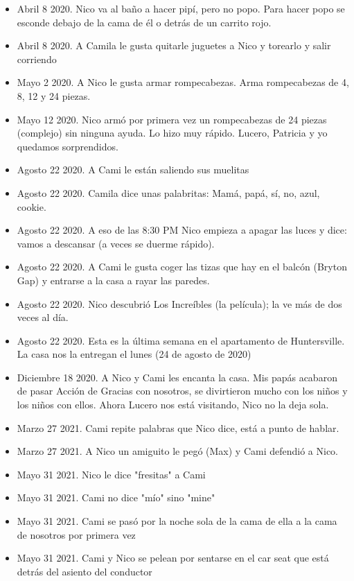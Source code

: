 \documentclass[12pt]{article}
\begin{document}
\begin{itemize}
  \item Abril 8 2020. Nico va al ba\~no a hacer pip\'i, pero no popo. Para hacer popo se esconde debajo de la cama de \'el o detr\'as de un carrito rojo.
  \item Abril 8 2020. A Camila le gusta quitarle juguetes a Nico y torearlo y salir corriendo
  \item Mayo 2 2020. A Nico le gusta armar rompecabezas. Arma rompecabezas de 4, 8, 12 y 24 piezas.
  \item Mayo 12 2020. Nico arm\'o por primera vez un rompecabezas de 24 piezas (complejo) sin ninguna ayuda. Lo hizo muy r\'apido. Lucero, Patricia y yo quedamos sorprendidos.
  \item Agosto 22 2020. A Cami le est\'an saliendo sus muelitas
  \item Agosto 22 2020. Camila dice unas palabritas: Mam\'a, pap\'a, s\'i, no, azul, cookie.
  \item Agosto 22 2020. A eso de las 8:30 PM Nico empieza a apagar las luces y dice: vamos a descansar (a veces se duerme r\'apido).
  \item Agosto 22 2020. A Cami le gusta coger las tizas que hay en el balc\'on (Bryton Gap) y entrarse a la casa a rayar las paredes.
  \item Agosto 22 2020. Nico descubri\'o Los Incre\'ibles (la pel\'icula); la ve m\'as de dos veces al d\'ia.
  \item Agosto 22 2020. Esta es la \'ultima semana en el apartamento de Huntersville. La casa nos la entregan el lunes (24 de agosto de 2020)
  \item Diciembre 18 2020. A Nico y Cami les encanta la casa. Mis pap\'as acabaron de pasar Acci\'on de Gracias con nosotros, se divirtieron mucho con los ni\~nos y los ni\~nos con ellos. Ahora Lucero nos est\'a visitando, Nico no la deja sola.
  \item Marzo 27 2021. Cami repite palabras que Nico dice, est\'a a punto de hablar.
  \item Marzo 27 2021. A Nico un amiguito le peg\'o (Max) y Cami defendi\'o a Nico.
  \item Mayo 31 2021. Nico le dice "fresitas" a Cami
  \item Mayo 31 2021. Cami no dice "m\'io" sino "mine"
  \item Mayo 31 2021. Cami se pas\'o por la noche sola de la cama de ella a la cama de nosotros por primera vez
  \item Mayo 31 2021. Cami y Nico se pelean por sentarse en el car seat que est\'a detr\'as del asiento del conductor

\end{itemize}
\end{document}
